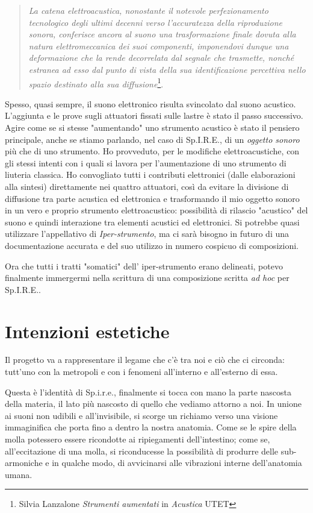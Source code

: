 \begin{quotation}
\textit{La catena elettroacustica, nonostante il notevole perfezionamento tecnologico degli ultimi decenni verso l'accuratezza della riproduzione sonora, conferisce ancora al suono una trasformazione finale dovuta alla natura elettromeccanica dei suoi componenti, imponendovi dunque una deformazione che la rende decorrelata dal segnale che trasmette, nonché estranea ad esso dal punto di vista della sua identificazione percettiva nello spazio destinato alla sua diffusione}\footnote{Silvia Lanzalone \textit{Strumenti aumentati} in \textit{Acustica} UTET}.
\end{quotation}

Spesso, quasi sempre, il suono elettronico risulta svincolato dal suono acustico. L'aggiunta e le prove sugli attuatori fissati sulle lastre è stato il passo successivo. Agire come se si stesse "aumentando" uno strumento acustico è stato il pensiero principale, anche se stiamo parlando, nel caso di Sp.I.R.E., di un \textit{oggetto sonoro} più che di uno strumento. Ho provveduto, per le modifiche elettroacustiche, con gli stessi intenti con i quali si lavora per l'aumentazione di uno strumento di liuteria classica. Ho convogliato tutti i contributi elettronici (dalle elaborazioni alla sintesi) direttamente nei quattro attuatori, così da evitare la divisione di diffusione tra parte acustica ed elettronica e trasformando il mio oggetto sonoro in un vero e proprio strumento elettroacustico: possibilità di rilascio "acustico" del suono e quindi interazione tra elementi acustici ed elettronici. Si potrebbe quasi utilizzare l'appellativo di \textit{Iper-strumento}, ma ci sarà bisogno in futuro di una documentazione accurata e del suo utilizzo in numero cospicuo di composizioni.

Ora che tutti i tratti "somatici" dell' iper-strumento erano delineati, potevo finalmente immergermi nella scrittura di una composizione scritta \textit{ad hoc} per Sp.I.R.E..

\section{Intenzioni estetiche}
Il progetto va a rappresentare il legame che c'è tra noi e ciò che ci circonda: tutt'uno con la metropoli e con i fenomeni all'interno e all'esterno di essa.

Questa è l'identità di Sp.i.r.e., finalmente si tocca con mano la parte nascosta della materia, il lato più nascosto di quello che vediamo attorno a noi. In unione ai suoni non udibili e all'invisibile, si scorge un richiamo verso una visione immaginifica che porta fino a dentro la nostra anatomia. Come se le spire della molla potessero essere ricondotte ai ripiegamenti dell'intestino; come se, all'eccitazione di una molla, si riconducesse la possibilità di produrre delle sub-armoniche e in qualche modo, di avvicinarsi alle vibrazioni interne dell'anatomia umana.

